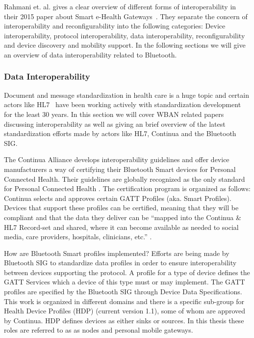 Rahmani et. al. gives a clear overview of different forms of interoperability in their 2015 paper about Smart e-Health Gateways~\cite{DrAmirMohammadRahmani:2014vx}. They separate the concern of interoperability and reconfigurability into the following categories: Device interoperability, protocol interoperability, data interoperability, reconfigurability and device discovery and mobility support. In the following sections we will give an overview of data interoperability related to Bluetooth.

\subsubsection{Data Interoperability} %
\label{ssub:data_interoperability}


Document and message standardization in health care is a huge topic and certain actors like HL7~\cite{hl7} have been working actively with standardization development for the least 30 years. In this section we will cover WBAN related papers discussing interoperability as well as giving an brief overview of the latest standardization efforts made by actors like HL7, Continua and the Bluetooth SIG.

The Continua Alliance develops interoperability guidelines and offer device manufacturers a way of certifying their Bluetooth Smart devices for Personal Connected Health. Their guidelines are globally recognized as the only standard for Personal Connected Health \cite{newRef:27}. The certification program is organized as follows: Continua selects and approves certain GATT Profiles (aka. Smart Profiles). Devices that support these profiles can be certified, meaning that they will be compliant and that the data they deliver can be ``mapped into the Continua & HL7 Record-set and shared, where it can become available as needed to social media, care providers, hospitals, clinicians, etc.'' \cite{newRef:27}.

How are Bluetooth Smart profiles implemented? Efforts are being made by Bluetooth SIG to standardize data profiles in order to ensure interoperability between devices supporting the protocol. A profile for a type of device defines the GATT Services which a device of this type must or may implement. The GATT profiles are specified by the Bluetooth SIG through Device Data Specifications. This work is organized in different domains and there is a specific sub-group for Health Device Profiles (HDP) (current version 1.1), some of whom are approved by Continua. HDP defines devices as either sinks or sources. In this thesis these roles are referred to as as nodes and personal mobile gateways.

